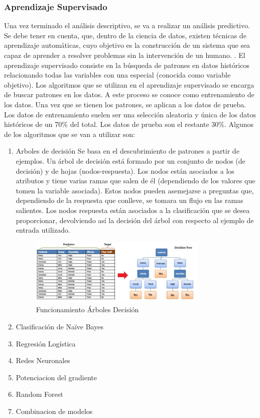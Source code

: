 \documentclass[spanish,12pt, a4paper,twoside]{paper}
\begin{document}
\subsubsection{Aprendizaje Supervisado}
\justify
Una vez terminado el análisis descriptivo, se va a realizar un análisis predictivo. Se debe tener en cuenta, que, dentro de la ciencia de datos, existen técnicas de aprendizaje automáticas, cuyo objetivo es la construcción de un sistema que sea capaz de aprender a resolver problemas sin la intervención de un humano. \cite{Marin2018}.
\justify
El aprendizaje supervisado consiste en la búsqueda de patrones en datos históricos relacionando todas las variables con una especial (conocida como variable objetivo). Los algoritmos que se utilizan en el aprendizaje supervisado se encarga de buscar patrones en los datos. A este proceso se conoce como entrenamiento de los datos. Una vez que se tienen los patrones, se aplican a los datos de prueba. Los datos de entrenamiento suelen ser una selección aleatoria y única de los datos históricos de un 70\% del total. Los datos de prueba son el restante 30\%. \cite{Manguart2017}
Algunos de los algoritmos que se van a utilizar son:
\begin{enumerate}
\item Arboles de decisión
\justify
Se basa en el descubrimiento de patrones a partir de ejemplos. Un árbol de decisión está formado por un conjunto de nodos (de decisión) y de hojas (nodos-respuesta).
\justify
Los nodos están asociados a los atributos y tiene varias ramas que salen de él (dependiendo de los valores que tomen la variable asociada). Estos nodos pueden asemejarse a preguntas que, dependiendo de la respuesta que conlleve, se tomara un flujo en las ramas salientes.
\justify
Los nodos respuesta están asociados a la clasificación que se desea proporcionar, devolviendo así la decisión del árbol con respecto al ejemplo de entrada utilizado.

\begin{figure}[htb]
\centering
 \includegraphics[width=0.8\textwidth]{recursos/arbol_decision_img1}
\caption{Funcionamiento Árboles Decisión}
\label{fig:fun_arb_dec}
\end{figure}
\FloatBarrier


\item Clasificación de Naïve Bayes
\item Regresión Logística
\item Redes Neuronales
\item Potenciacion del gradiente
\item Random Forest
\item Combinacion de modelos
\end{enumerate}
\end{document}

